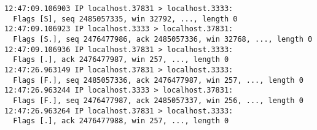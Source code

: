 \documentclass[varwidth=37em,crop]{standalone}
\begin{document}
\begin{verbatim}
12:47:09.106903 IP localhost.37831 > localhost.3333:
  Flags [S], seq 2485057335, win 32792, ..., length 0
12:47:09.106923 IP localhost.3333 > localhost.37831:
  Flags [S.], seq 2476477986, ack 2485057336, win 32768, ..., length 0
12:47:09.106936 IP localhost.37831 > localhost.3333:
  Flags [.], ack 2476477987, win 257, ..., length 0
12:47:26.963149 IP localhost.37831 > localhost.3333:
  Flags [F.], seq 2485057336, ack 2476477987, win 257, ..., length 0
12:47:26.963244 IP localhost.3333 > localhost.37831:
  Flags [F.], seq 2476477987, ack 2485057337, win 256, ..., length 0
12:47:26.963264 IP localhost.37831 > localhost.3333:
  Flags [.], ack 2476477988, win 257, ..., length 0
\end{verbatim}
\end{document}
